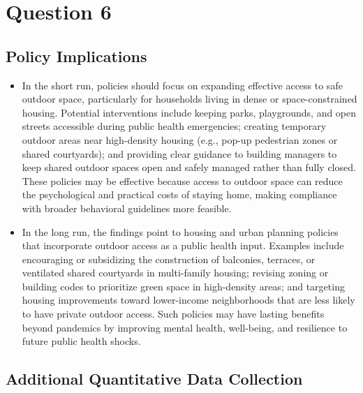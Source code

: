 \documentclass[
  letterpaper,
  DIV=11,
  numbers=noendperiod]{scrartcl}
\begin{document}
\section{Question 6}\label{question-6}

\subsection{Policy Implications}\label{policy-implications}

\begin{itemize}
\item
  In the short run, policies should focus on expanding effective access
  to safe outdoor space, particularly for households living in dense or
  space-constrained housing. Potential interventions include keeping
  parks, playgrounds, and open streets accessible during public health
  emergencies; creating temporary outdoor areas near high-density
  housing (e.g., pop-up pedestrian zones or shared courtyards); and
  providing clear guidance to building managers to keep shared outdoor
  spaces open and safely managed rather than fully closed. These
  policies may be effective because access to outdoor space can reduce
  the psychological and practical costs of staying home, making
  compliance with broader behavioral guidelines more feasible.
\item
  In the long run, the findings point to housing and urban planning
  policies that incorporate outdoor access as a public health input.
  Examples include encouraging or subsidizing the construction of
  balconies, terraces, or ventilated shared courtyards in multi-family
  housing; revising zoning or building codes to prioritize green space
  in high-density areas; and targeting housing improvements toward
  lower-income neighborhoods that are less likely to have private
  outdoor access. Such policies may have lasting benefits beyond
  pandemics by improving mental health, well-being, and resilience to
  future public health shocks.
\end{itemize}

\subsection{Additional Quantitative Data
Collection}\label{additional-quantitative-data-collection}
\end{document}
